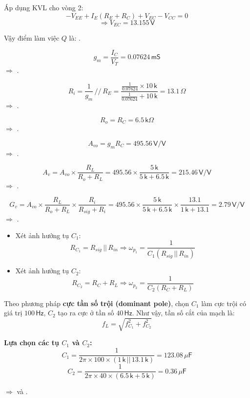 Áp dụng KVL cho vòng 2:
\[
- V_{EE}+I_{E}(R_{E}+R_{C})+V_{EC}-V_{CC}=0
\]
\[
\Rightarrow V_{EC}=13.155\,\textsf{V}
\]

Vậy điểm làm việc $Q$ là: .


\[
g_{m}=\frac{I_{C}}{V_{T}}=0.07624\,\textsf{mS}
\]
$\Rightarrow$ .

\[
R_{i}=\frac{1}{g_{m}}\,//\,R_{E}=\frac{\frac{1}{0.07624}\times10\,\textsf{k}}{\frac{1}{0.07624}+10\,\textsf{k}}=13.1\,\Omega
\]
$\Rightarrow$ .

\[
R_{o}=R_{C}=6.5\,\textsf{k}\Omega
\]
$\Rightarrow$ .

\[
A_{vo}=g_{m}R_{C}=495.56\,\textsf{V/V}
\]
$\Rightarrow$ .

\[
A_{v}=A_{vo}\times\frac{R_{L}}{R_{o}+R_{L}}=495.56\times\frac{5\,\textsf{k}}{5\,\textsf{k}+6.5\,\textsf{k}}=215.46\,\textsf{V/V}
\]
$\Rightarrow$ .

\[
G_{v}=A_{vo}\times\frac{R_{L}}{R_{o}+R_{L}}\times\frac{R_{i}}{R_{sig}+R_{i}}=495.56\times\frac{5\,\textsf{k}}{5\,\textsf{k}+6.5\,\textsf{k}}\times\frac{13.1}{1\,\textsf{k}+13.1}=2.79\,\textsf{V/V}
\]
$\Rightarrow$ .


\begin{itemize}[label=-]
	\item Xét ảnh hưởng tụ $C_{1}$: 
	\[
	R_{C_{1}} = R_{sig} \,||\, R_{in}
	\Longrightarrow 
	\omega_{p_{1}} = \frac{1}{C_{1}\left(R_{sig} \,||\, R_{in}\right)}
	\]
	
	\item Xét ảnh hưởng tụ $C_{2}$: 
	\[
	R_{C_{2}} = R_{C} + R_{L}
	\Longrightarrow 
	\omega_{p_{2}} = \frac{1}{C_{2}\left(R_{C} + R_{L}\right)}
	\]
\end{itemize}

Theo phương pháp \textbf{cực tần số trội (dominant pole)}, chọn $C_{1}$ làm cực trội có giá trị $100\,\textsf{Hz}$, 
$C_{2}$ tạo ra cực ở tần số $40\,\textsf{Hz}$.  
Như vậy, tần số cắt của mạch là:
\[
f_{L} = \sqrt{f_{C_{1}}^{2} + f_{C_{2}}^{2}}
\]

\textbf{Lựa chọn các tụ $C_{1}$ và $C_{2}$:}
\[
C_{1} = \frac{1}{2\pi \times 100 \times (1\,\textsf{k}\,||\,13.1\,\textsf{k})}
= 123.08\,\mu\textsf{F}
\]
\[
C_{2} = \frac{1}{2\pi \times 40 \times (6.5\,\textsf{k} + 5\,\textsf{k})}
= 0.36\,\mu\textsf{F}
\]

$\Rightarrow$  và .
